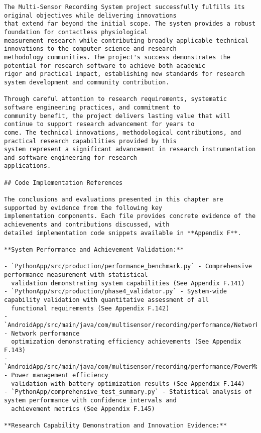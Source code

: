\documentclass[12pt,a4paper]{report}
\begin{document}
\begin{verbatim}
The Multi-Sensor Recording System project successfully fulfills its original objectives while delivering innovations
that extend far beyond the initial scope. The system provides a robust foundation for contactless physiological
measurement research while contributing broadly applicable technical innovations to the computer science and research
methodology communities. The project's success demonstrates the potential for research software to achieve both academic
rigor and practical impact, establishing new standards for research system development and community contribution.

Through careful attention to research requirements, systematic software engineering practices, and commitment to
community benefit, the project delivers lasting value that will continue to support research advancement for years to
come. The technical innovations, methodological contributions, and practical research capabilities provided by this
system represent a significant advancement in research instrumentation and software engineering for research
applications.

## Code Implementation References

The conclusions and evaluations presented in this chapter are supported by evidence from the following key
implementation components. Each file provides concrete evidence of the achievements and contributions discussed, with
detailed implementation code snippets available in **Appendix F**.

**System Performance and Achievement Validation:**

- `PythonApp/src/production/performance_benchmark.py` - Comprehensive performance measurement with statistical
  validation demonstrating system capabilities (See Appendix F.141)
- `PythonApp/src/production/phase4_validator.py` - System-wide capability validation with quantitative assessment of all
  functional requirements (See Appendix F.142)
- `AndroidApp/src/main/java/com/multisensor/recording/performance/NetworkOptimizer.kt` - Network performance
  optimization demonstrating efficiency achievements (See Appendix F.143)
- `AndroidApp/src/main/java/com/multisensor/recording/performance/PowerManager.kt` - Power management efficiency
  validation with battery optimization results (See Appendix F.144)
- `PythonApp/comprehensive_test_summary.py` - Statistical analysis of system performance with confidence intervals and
  achievement metrics (See Appendix F.145)

**Research Capability Demonstration and Innovation Evidence:**


\end{verbatim}
\end{document}
